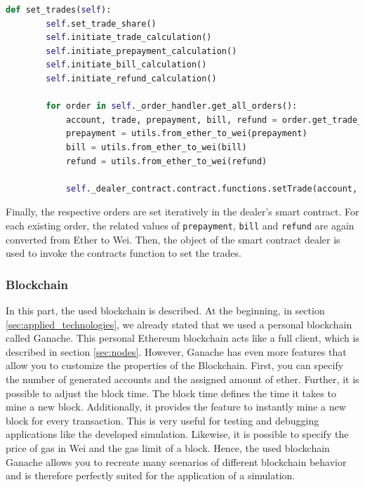 \begin{lstlisting}[float=htbp, label=lst:offchain_set_trades, caption=Submitment of trades, language=Python]
    def set_trades(self):
        self.set_trade_share()
        self.initiate_trade_calculation()
        self.initiate_prepayment_calculation()
        self.initiate_bill_calculation()
        self.initiate_refund_calculation()

        for order in self._order_handler.get_all_orders():
            account, trade, prepayment, bill, refund = order.get_trade_information()
            prepayment = utils.from_ether_to_wei(prepayment)
            bill = utils.from_ether_to_wei(bill)
            refund = utils.from_ether_to_wei(refund)

            self._dealer_contract.contract.functions.setTrade(account, trade, prepayment, bill, refund).transact({'from': self._account_address})
\end{lstlisting}

Finally, the respective orders are set iteratively in the dealer's smart contract. For each existing order, the related values of 
\verb|prepayment|, \verb|bill| and \verb|refund| are again converted from Ether to Wei. Then, the object of the smart 
contract dealer is used to invoke the contracts function to set the trades.


\subsubsection{Blockchain}
In this part, the used blockchain is described. At the beginning, in section \ref{sec:applied_technologies}, we already
stated that we used a personal blockchain called Ganache. 
This personal Ethereum blockchain acts like a full client, which is described in section \ref{sec:nodes}.
However, Ganache has even more features that allow you to customize the properties of the Blockchain.
First, you can specify the number of generated accounts and the assigned amount of ether.
Further, it is possible to adjust the block time. The block time defines the time it takes to mine a new block. 
Additionally, it provides the feature to instantly mine a new block for every transaction. 
This is very useful for testing and debugging applications like the developed simulation.
Likewise, it is possible to specify the price of gas in Wei and the gas limit of a block. 
Hence, the used blockchain Ganache allows you to recreate many scenarios of different blockchain behavior
and is therefore perfectly suited for the application of a simulation.


